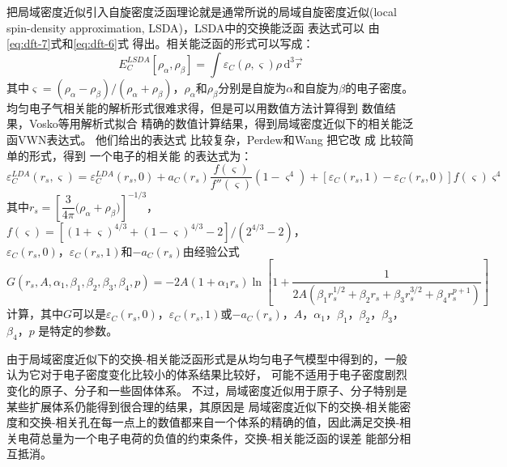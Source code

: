 把局域密度近似引入自旋密度泛函理论就是通常所说的局域{自旋}密度近似(local spin-density approximation, LSDA)，LSDA中的交换能{泛函}%
{表达}式可以%
{由}\eqref{eq:dft-7}式和\eqref{eq:dft-6}式%
{得}出{。}相关能泛函的形式可以写成：
$$E_C^{LSDA}[\rho_{\alpha},\rho_{\beta}]=\int{\varepsilon_C(\rho,\varsigma)\rho\,\textrm{d}^3\vec{r}}$$
其中$\varsigma=(\rho_{\alpha}-\rho_{\beta})
/(\rho_{\alpha}+\rho_{\beta})
$，$\rho_{\alpha}$和$\rho_{\beta}$分别是自旋为$\alpha$和自旋为$\beta$的电子密度。均匀电子气相关能的解析形式很难求得，但是可以用数值方法计算得到%
数值结果，Vosko等\cite{CJP58-1200_1980}用解析式拟合%
精确的数值计算结果，得到局域密度近似下的相关能泛函VWN表达式{。}%
他们给出的表达式%
{比较}复杂，Perdew和Wang\cite{PRB45-13244_1992}%
把它改%
成%
{比较}简单的形式，得到%
{一个电子的}相关能%
{的}表达式为：
\begin{equation}
  \label{eq:dft-8}
\varepsilon_C^{LDA}(r_s,\varsigma)=\varepsilon_C^{LDA}(r_s,0)+a_C(r_s)\dfrac{f(\varsigma)}{f''(\varsigma)}(1-\varsigma^4)+[\varepsilon_C(r_s,1)-\varepsilon_C(r_s,0)]f(\varsigma)\varsigma^4
\end{equation}
其中$r_s=\left[\dfrac 3{4\pi}\bigl(\rho_{\alpha}+\rho_{\beta}\bigr)\right]^{-1/3}$，$f(\varsigma)=[(1+\varsigma)^{4/3}+(1-\varsigma)^{4/3}-2]/(2^{4/3}-2)$，\\$\varepsilon_C(r_s,0)$，$\varepsilon_C(r_s,1)$和$-a_C(r_s)$由经验公式
$$G(r_s,A,\alpha_1,\beta_1,\beta_2,\beta_3,\beta_4,p)=-2A(1+\alpha_1r_s)\ln\left[1+\dfrac1{2A(\beta_1r_s^{1/2}+\beta_2r_s+\beta_3r_s^{3/2}+\beta_4r_s^{p+1})}\right]$$
计算{，}其中{$G$可以是$\varepsilon_C(r_s,0)$，$\varepsilon_C(r_s,1)$或$-a_C(r_s)$}，$A$，$\alpha_1$，$\beta_1$，$\beta_2$，$\beta_3$，$\beta_4$，$p$%
是{特定的}参数。

由于局域密度近似下的交换-相关能泛函形式是从均匀电子气模型中得到的，一般认为它对于电子密度变化比较小的体系结果比较好，%
{可能}不适用于电子密度剧烈变化的原子、分子和一些固体体系。%
{不过}，局域密度近似用于原子、分子特别是某些扩展体系仍能得到很合理的结果，其原因是%
局域密度近似下的交换-相关能密度和交换-相关孔在每一点上的数值都来自一个体系的精确的值，因此满足交换-相关电荷总量为一个电子电荷的负值的约束条件，交换-相关能泛函的误差%
{能部分}相互抵消。

